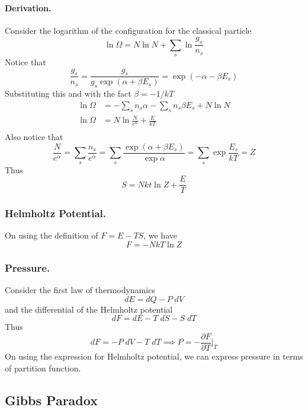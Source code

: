\documentclass[../../../Main.tex]{subfiles}
\begin{document}
\paragraph*{Derivation.} Consider the logarithm of the configuration for the classical particle 
\begin{equation*}
    \ln \Omega=N\ln N +\sum_s\ln\frac{g_s}{n_s}
\end{equation*} 
Notice that
\begin{equation*}
    \frac{g_s}{n_s}=\frac{g_s}{g_s\exp(\alpha+\beta E_s)}=\exp(-\alpha-\beta E_s)
\end{equation*}
Substituting this and with the fact $\beta=-1/kT$
\begin{align*}
    \ln \Omega&=-\sum_sn_s\alpha-\sum_sn_s\beta E_s+N\ln N\\
    \ln\Omega&= N\ln \frac{N}{e^\alpha}+\frac{E}{kT}\\
\end{align*}
Also notice that 
\begin{equation*}
    \frac{N}{e^\alpha}=\sum_s\frac{n_s}{e^\alpha}=\sum_s\frac{\exp(\alpha+\beta E_s)}{\exp\alpha}=\sum_s\exp \frac{E_s}{kT}=Z
\end{equation*}
Thus
\begin{equation*}
    S=Nkt\ln Z+\frac{E}{T}
\end{equation*}

\subsubsection*{Helmholtz Potential.} On using the definition of $F=E-TS$, we have 
\begin{equation*}
    F=-NkT\ln Z
\end{equation*}

\subsubsection*{Pressure.} Consider the first law of thermodynamics
\begin{equation*}
    dE=dQ-P\;dV
\end{equation*}
and the differential of the Helmholtz potential 
\begin{equation*}
    dF=dE-T\;dS-S\;dT
\end{equation*}
Thus 
\begin{equation*}
    dF=-P\;dV-T\;dT\implies P=-\frac{\partial F}{\partial T}\bigg|_{T}
\end{equation*}
On using the expression for Helmholtz potential, we can express pressure in terms of partition function.
\subsection*{Gibbs Paradox}
\end{document}
